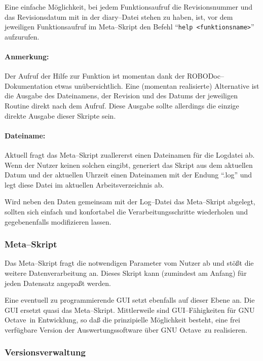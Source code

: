 \documentclass{article}
\def\octave{\textsf{GNU Octave}} \def\robodoc{\textsf{ROBODoc}}
\newcommand{\cmd}[1]{\texttt{#1}}
\begin{document}
Eine einfache Möglichkeit, bei jedem Funktionsaufruf die Revisionsnummer und 
das Revisionsdatum mit in der diary--Datei stehen zu haben, ist, vor dem 
jeweiligen Funktionsaufruf im Meta--Skript den Befehl ``\cmd{help 
<funktionsname>}'' aufzurufen.

\paragraph{Anmerkung:} Der Aufruf der Hilfe zur Funktion ist momentan dank der 
\robodoc--Dokumentation etwas unübersichtlich. Eine (momentan realisierte)
Alternative ist die Ausgabe des Dateinamens, der Revision und des Datums der
jeweiligen Routine direkt nach dem Aufruf. Diese Ausgabe sollte allerdings die
einzige direkte Ausgabe dieser Skripte sein.

\paragraph{Dateiname:} Aktuell fragt das Meta--Skript zuallererst einen
Dateinamen für die Logdatei ab. Wenn der Nutzer keinen solchen eingibt,
generiert das Skript aus dem aktuellen Datum und der aktuellen Uhrzeit einen
Dateinamen mit der Endung ``.log'' und legt diese Datei im aktuellen
Arbeitsverzeichnis ab.

Wird neben den Daten gemeinsam mit der Log--Datei das Meta--Skript abgelegt, 
sollten sich einfach und konfortabel die Verarbeitungsschritte wiederholen und 
gegebenenfalls modifizieren lassen.


\subsubsection{Meta--Skript}

Das Meta--Skript fragt die notwendigen Parameter vom Nutzer ab und stößt die 
weitere Datenverarbeitung an. Dieses Skript kann (zumindest am Anfang) für 
jeden Datensatz angepaßt werden.

Eine eventuell zu programmierende GUI setzt ebenfalls auf dieser Ebene an. Die 
GUI ersetzt quasi das Meta--Skript. Mittlerweile sind GUI--Fähigkeiten für 
\octave\ in Entwicklung, so daß die prinzipielle Möglichkeit besteht, eine frei 
verfügbare Version der Auswertungssoftware über \octave\ zu realisieren.


\subsubsection{Versionsverwaltung}
\end{document}
